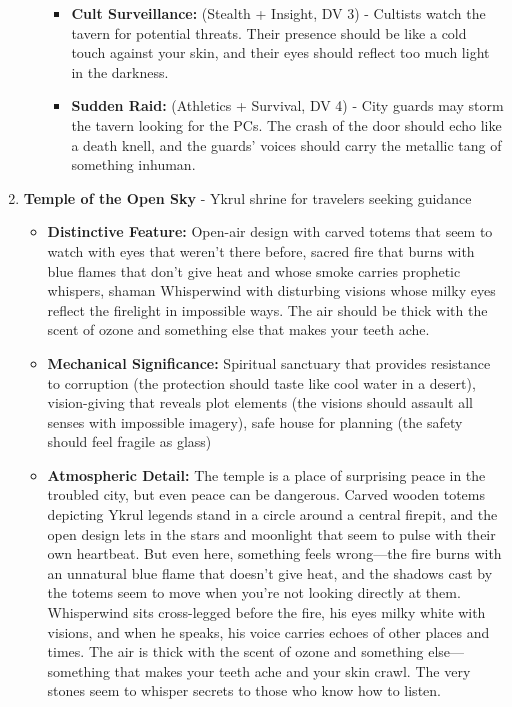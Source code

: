 \documentclass[11pt]{article}
\begin{document}
\begin{enumerate}
\begin{itemize}
\begin{itemize}
    \item \textbf{Cult Surveillance:} (Stealth + Insight, DV 3) - Cultists watch the tavern for potential threats. Their presence should be like a cold touch against your skin, and their eyes should reflect too much light in the darkness.
    \item \textbf{Sudden Raid:} (Athletics + Survival, DV 4) - City guards may storm the tavern looking for the PCs. The crash of the door should echo like a death knell, and the guards' voices should carry the metallic tang of something inhuman.
    \end{itemize}
  \end{itemize}
\item \textbf{Temple of the Open Sky} - Ykrul shrine for travelers seeking guidance
  \begin{itemize}
  \item \textbf{Distinctive Feature:} Open-air design with carved totems that seem to watch with eyes that weren't there before, sacred fire that burns with blue flames that don't give heat and whose smoke carries prophetic whispers, shaman Whisperwind with disturbing visions whose milky eyes reflect the firelight in impossible ways. The air should be thick with the scent of ozone and something else that makes your teeth ache.
  \item \textbf{Mechanical Significance:} Spiritual sanctuary that provides resistance to corruption (the protection should taste like cool water in a desert), vision-giving that reveals plot elements (the visions should assault all senses with impossible imagery), safe house for planning (the safety should feel fragile as glass)
  \item \textbf{Atmospheric Detail:} The temple is a place of surprising peace in the troubled city, but even peace can be dangerous. Carved wooden totems depicting Ykrul legends stand in a circle around a central firepit, and the open design lets in the stars and moonlight that seem to pulse with their own heartbeat. But even here, something feels wrong—the fire burns with an unnatural blue flame that doesn't give heat, and the shadows cast by the totems seem to move when you're not looking directly at them. Whisperwind sits cross-legged before the fire, his eyes milky white with visions, and when he speaks, his voice carries echoes of other places and times. The air is thick with the scent of ozone and something else—something that makes your teeth ache and your skin crawl. The very stones seem to whisper secrets to those who know how to listen.

\end{itemize}
\end{enumerate}
\end{document}
